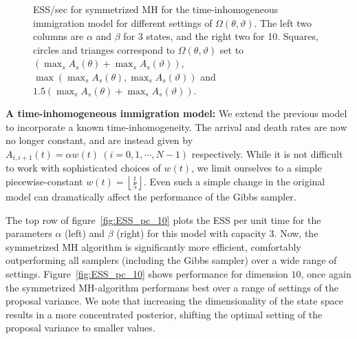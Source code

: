 \begin{figure}[H]
\begin{minipage}[hp]{0.24\linewidth}
	\end{minipage}
    \caption{ESS/sec for symmetrized MH for the time-inhomogeneous immigration model for different settings of $\Omega(\theta,\vartheta)$. The left two columns are $\alpha$ and $\beta$ for 3 states, and the right two for 10. 
    Squares, circles and trianges correspond to $\Omega(\theta,\vartheta)$ set to $(\max_s A_s(\theta) + \max_s A_s(\vartheta))$, $\max(\max_s A_s(\theta), \max_s A_s(\vartheta))$ and  $1.5(\max_s A_s(\theta) + \max_s A_s(\vartheta))$.}
     \label{fig:mhESS_CQ}
  \end{figure}



\noindent \textbf{A time-inhomogeneous immigration model:}
We extend the previous model to incorporate a known time-inhomogeneity. 
The arrival and death rates are now no longer constant, and are instead given by
$A_{i, i+1}(t) = \alpha w(t) \ (i =0,1,\cdots,N-1)$ respectively.
While it is not difficult to work with sophisticated choices of $w(t)$, we limit ourselves to a simple piecewise-constant $w(t) = \left\lfloor \frac{t}{5} \right\rfloor$. 
Even such a simple change in the original model can dramatically affect the performance of the Gibbs sampler. 

 The top row of figure~\ref{fig:ESS_pc_10} plots the ESS per unit time for the parameters $\alpha$ (left) and $\beta$ (right) for this model with capacity $3$.  
 Now, the symmetrized MH algorithm is significantly more efficient, comfortably outperforming all samplers (including the Gibbs 
 sampler) over a wide range of settings. %
 Figure~\ref{fig:ESS_pc_10} shows performance for dimension $10$, once again the symmetrized MH-algorithm performans best over a range of settings of the proposal variance. We note that increasing the
 dimensionality of the state space results in a more concentrated posterior, shifting the optimal setting of the proposal variance to smaller values.

